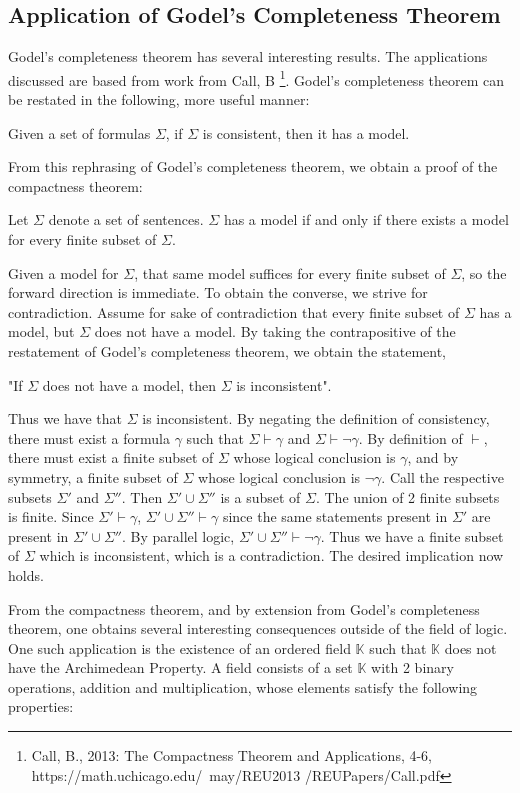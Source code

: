 \documentclass[%
 reprint,
 amsmath,amssymb,
 aps,
]{revtex4-2}
\begin{document}
\subsection{Application of Godel's Completeness Theorem}

Godel's completeness theorem has several interesting results.  The applications discussed are based from work from Call, B \footnote{Call, B., 2013: The Compactness Theorem and Applications, 4-6, https://math.uchicago.edu/~may/REU2013 /REUPapers/Call.pdf}.  Godel's completeness theorem can be restated in the following, more useful manner:

Given a set of formulas $\Sigma$, if $\Sigma$ is consistent, then it has a model.

From this rephrasing of Godel's completeness theorem, we obtain a proof of the compactness theorem:

Let $\Sigma$ denote a set of sentences.  $\Sigma$ has a model if and only if there exists a model for every finite subset of $\Sigma$.  

Given a model for $\Sigma$, that same model suffices for every finite subset of $\Sigma$, so the forward direction is immediate.  To obtain the converse, we strive for contradiction.  Assume for sake of contradiction that every finite subset of $\Sigma$ has a model, but $\Sigma$ does not have a model.  By taking the contrapositive of the restatement of Godel's completeness theorem, we obtain the statement, 

"If $\Sigma$ does not have a model, then $\Sigma$ is inconsistent".

Thus we have that $\Sigma$ is inconsistent.  By negating the definition of consistency, there must exist a formula $\gamma$ such that $\Sigma \vdash \gamma$ and $\Sigma \vdash \neg \gamma$. By definition of $\vdash$, there must exist a finite subset of $\Sigma$ whose logical conclusion is $\gamma$, and by symmetry, a finite subset of $\Sigma$ whose logical conclusion is $\neg \gamma$.  Call the respective subsets $\Sigma'$ and $\Sigma''$.  Then $\Sigma' \cup \Sigma''$ is a subset of $\Sigma$.  The union of 2 finite subsets is finite.  Since $\Sigma' \vdash \gamma$, $\Sigma' \cup \Sigma'' \vdash \gamma$ since the same statements present in $\Sigma'$ are present in $\Sigma' \cup \Sigma''$.  By parallel logic, $\Sigma' \cup \Sigma'' \vdash \neg \gamma$.  Thus we have a finite subset of $\Sigma$ which is inconsistent, which is a contradiction.  The desired implication now holds.  

From the compactness theorem, and by extension from Godel's completeness theorem, one obtains several interesting consequences outside of the field of logic.  One such application is the existence of an ordered field $\mathbb{K}$ such that $\mathbb{K}$ does not have the Archimedean Property.  A field consists of a set $\mathbb{K}$ with 2 binary operations, addition and multiplication, whose elements satisfy the following properties:
\end{document}
